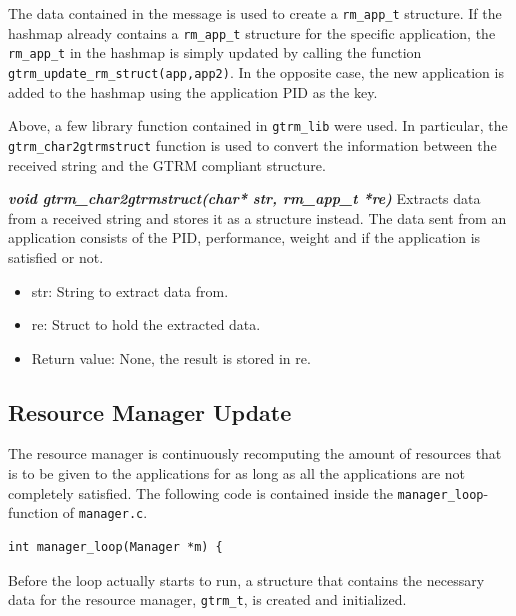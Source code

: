 \documentclass[nobiblatex]{LTHthesis}
\begin{document}
The data contained in the message is used to create a \texttt{rm\_app\_t}
structure. If the hashmap already contains a \texttt{rm\_app\_t} structure 
for the specific application, the \texttt{rm\_app\_t} in the hashmap is
simply updated by calling the function 
\texttt{gtrm\_update\_rm\_struct(app,app2)}. In the opposite case, the new
application is added to the hashmap using the application PID as the key.

Above, a few library function contained in \texttt{gtrm\_lib} were used.
In particular, the \texttt{gtrm\_char2gtrmstruct} function is used to
convert the information between the received string and the GTRM
compliant structure.
\begin{framed}
	\begin{flushleft}
		\textbf{\emph{void gtrm\_char2gtrmstruct(char* str, rm\_app\_t *re)}}
		Extracts data from a received string and stores it as a structure 
	instead. The data sent from an application consists of the PID,
	performance, weight and if the application is satisfied or not.
		\begin{itemize} 
		\item str: String to extract data from.
		\item re: Struct to hold the extracted data.
		\item Return value: None, the result is stored in re.
		\end{itemize}
	\end{flushleft}	
\end{framed}

\subsection{Resource Manager Update}
The resource manager is continuously recomputing the amount of resources that is to be given to the applications for as long as all the applications are not completely satisfied. The following code is contained inside the 
\texttt{manager\_loop}-function of \texttt{manager.c}.

\begin{lstlisting}
int manager_loop(Manager *m) {
\end{lstlisting}

Before the loop actually starts to run, a structure that contains the
necessary data for the resource manager, \texttt{gtrm\_t}, is created 
and initialized.
\end{document}
